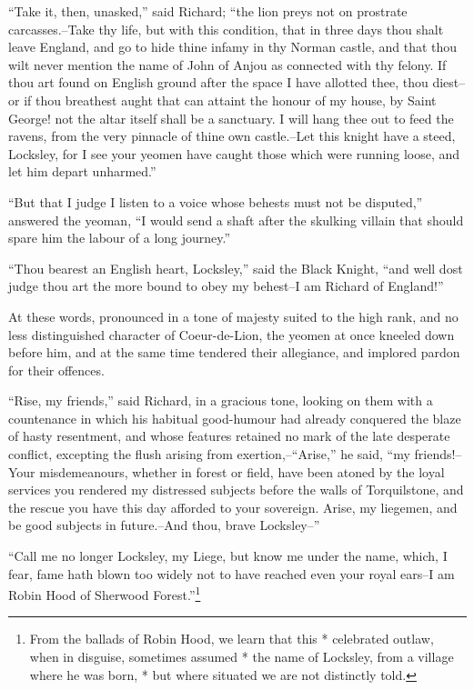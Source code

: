 ``Take it, then, unasked,'' said Richard; ``the lion preys not on
prostrate carcasses.--Take thy life, but with this condition, that in
three days thou shalt leave England, and go to hide thine infamy in thy
Norman castle, and that thou wilt never mention the name of John of
Anjou as connected with thy felony. If thou art found on English ground
after the space I have allotted thee, thou diest--or if thou breathest
aught that can attaint the honour of my house, by Saint George! not the
altar itself shall be a sanctuary. I will hang thee out to feed the
ravens, from the very pinnacle of thine own castle.--Let this knight
have a steed, Locksley, for I see your yeomen have caught those which
were running loose, and let him depart unharmed.''

``But that I judge I listen to a voice whose behests must not be
disputed,'' answered the yeoman, ``I would send a shaft after the
skulking villain that should spare him the labour of a long journey.''

``Thou bearest an English heart, Locksley,'' said the Black Knight,
``and well dost judge thou art the more bound to obey my behest--I am
Richard of England!''

At these words, pronounced in a tone of majesty suited to the high rank,
and no less distinguished character of Coeur-de-Lion, the yeomen at once
kneeled down before him, and at the same time tendered their allegiance,
and implored pardon for their offences.

``Rise, my friends,'' said Richard, in a gracious tone, looking on them
with a countenance in which his habitual good-humour had already
conquered the blaze of hasty resentment, and whose features retained no
mark of the late desperate conflict, excepting the flush arising from
exertion,--``Arise,'' he said, ``my friends!--Your misdemeanours,
whether in forest or field, have been atoned by the loyal services you
rendered my distressed subjects before the walls of Torquilstone, and
the rescue you have this day afforded to your sovereign. Arise, my
liegemen, and be good subjects in future.--And thou, brave Locksley--''

``Call me no longer Locksley, my Liege, but know me under the name,
which, I fear, fame hath blown too widely not to have reached even your
royal ears--I am Robin Hood of Sherwood Forest.''\footnote{From the
ballads of Robin Hood, we learn that this *
celebrated outlaw, when in disguise, sometimes assumed * the name of
Locksley, from a village where he was born, * but where situated we are
not distinctly told.}

